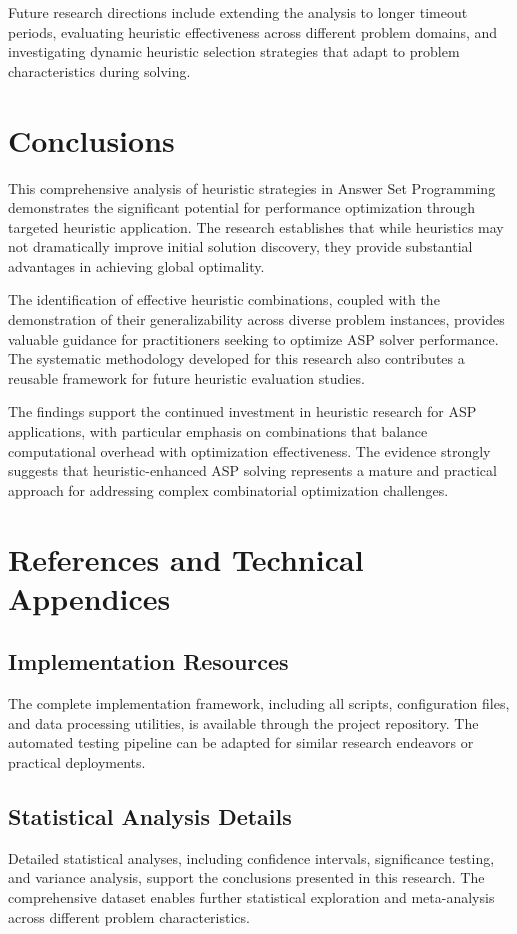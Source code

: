 \documentclass[11pt,a4paper]{article}
\begin{document}
Future research directions include extending the analysis to longer timeout periods, evaluating heuristic effectiveness across different problem domains, and investigating dynamic heuristic selection strategies that adapt to problem characteristics during solving.

\section{Conclusions}

This comprehensive analysis of heuristic strategies in Answer Set Programming demonstrates the significant potential for performance optimization through targeted heuristic application. The research establishes that while heuristics may not dramatically improve initial solution discovery, they provide substantial advantages in achieving global optimality.

The identification of effective heuristic combinations, coupled with the demonstration of their generalizability across diverse problem instances, provides valuable guidance for practitioners seeking to optimize ASP solver performance. The systematic methodology developed for this research also contributes a reusable framework for future heuristic evaluation studies.

The findings support the continued investment in heuristic research for ASP applications, with particular emphasis on combinations that balance computational overhead with optimization effectiveness. The evidence strongly suggests that heuristic-enhanced ASP solving represents a mature and practical approach for addressing complex combinatorial optimization challenges.

\section{References and Technical Appendices}

\subsection{Implementation Resources}

The complete implementation framework, including all scripts, configuration files, and data processing utilities, is available through the project repository. The automated testing pipeline can be adapted for similar research endeavors or practical deployments.

\subsection{Statistical Analysis Details}

Detailed statistical analyses, including confidence intervals, significance testing, and variance analysis, support the conclusions presented in this research. The comprehensive dataset enables further statistical exploration and meta-analysis across different problem characteristics.
\end{document}
